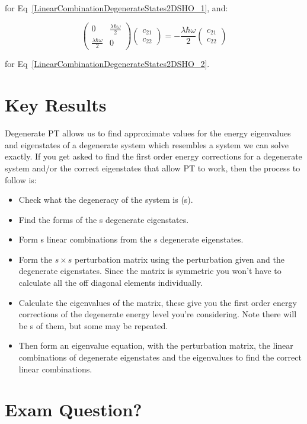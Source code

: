\noindent for Eq~\ref{LinearCombinationDegenerateStates2DSHO_1}, and:

\begin{equation}
    \begin{pmatrix} 0 & \frac{\lambda \hbar \omega}{2} \\ \frac{\lambda \hbar \omega}{2} & 0 \end{pmatrix} \begin{pmatrix} c_{21} \\ c_{22} \end{pmatrix} = - \frac{\lambda \hbar \omega}{2} \begin{pmatrix} c_{21} \\ c_{22} \end{pmatrix}
\end{equation}

\noindent for Eq~\ref{LinearCombinationDegenerateStates2DSHO_2}.

\section{Key Results}
Degenerate PT allows us to find approximate values for the energy eigenvalues and eigenstates of a degenerate system which resembles a system we can solve exactly. If you get asked to find the first order energy corrections for a degenerate system and/or the correct eigenstates that allow PT to work, then the process to follow is:

\begin{itemize}
    \item Check what the degeneracy of the system is (s).
    \item Find the forms of the s degenerate eigenstates.
    \item Form s linear combinations from the s degenerate eigenstates.
    \item Form the $s \times s$ perturbation matrix using the perturbation given and the degenerate eigenstates. Since the matrix is symmetric you won't have to calculate all the off diagonal elements individually.
    \item Calculate the eigenvalues of the matrix, these give you the first order energy corrections of the degenerate energy level you're considering. Note there will be s of them, but some may be repeated.
    \item Then form an eigenvalue equation, with the perturbation matrix, the linear combinations of degenerate eigenstates and the eigenvalues to find the correct linear combinations.
\end{itemize}

\section{Exam Question?}


